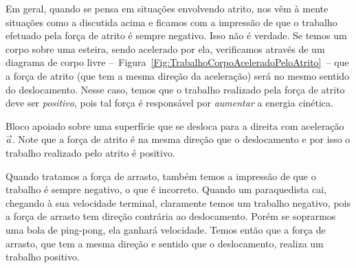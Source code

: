Em geral, quando se pensa em situações envolvendo atrito, nos vêm à mente situações como a discutida acima e ficamos com a impressão de que o trabalho efetuado pela força de atrito é sempre negativo. Isso não é verdade. Se temos um corpo sobre uma esteira, sendo acelerado por ela, verificamos através de um diagrama de corpo livre --~Figura~\ref{Fig:TrabalhoCorpoAceleradoPeloAtrito}~-- que a força de atrito (que tem a mesma direção da aceleração) será no mesmo sentido do deslocamento. Nesse caso, temos que o trabalho realizado pela força de atrito deve ser \emph{positivo}, pois tal força é responsável por \emph{aumentar} a energia cinética.
\begin{marginfigure}
\centering
{}
\caption{Bloco apoiado sobre uma superfície que se desloca para a direita com aceleração $\vec{a}$. Note que a força de atrito é na mesma direção que o deslocamento e por isso o trabalho realizado pelo atrito é positivo. \label{Fig:TrabalhoCorpoAceleradoPeloAtrito}}
\end{marginfigure}

Quando tratamos a força de arrasto, também temos a impressão de que o trabalho é sempre negativo, o que é incorreto. Quando um paraquedista cai, chegando à sua velocidade terminal, claramente temos um trabalho negativo, pois a força de arrasto tem direção contrária ao deslocamento. Porém se soprarmos uma bola de ping-pong, ela ganhará velocidade. Temos então que a força de arrasto, que tem a mesma direção e sentido que o deslocamento, realiza um trabalho positivo.

